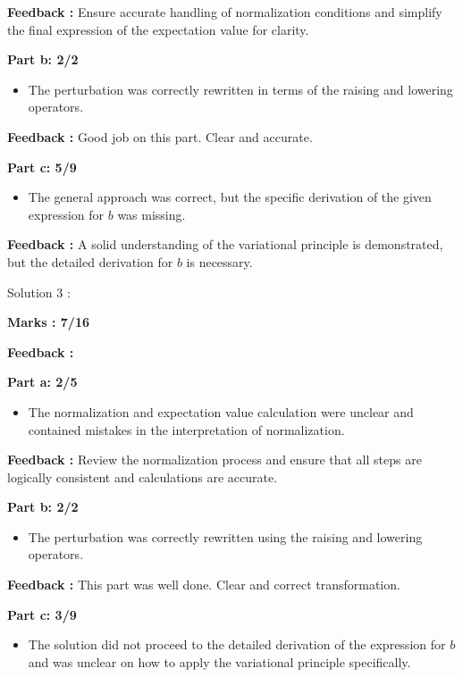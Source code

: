 \documentclass[a4paper,11pt]{article}
\begin{document}
\textbf{Feedback :}
Ensure accurate handling of normalization conditions and simplify the final expression of the expectation value for clarity.


\textbf{Part b: 2/2}
\begin{itemize}
    \item The perturbation was correctly rewritten in terms of the raising and lowering operators.
\end{itemize}

\textbf{Feedback :}
Good job on this part. Clear and accurate.


\textbf{Part c: 5/9}
\begin{itemize}
    \item The general approach was correct, but the specific derivation of the given expression for $b$ was missing.
\end{itemize}

\textbf{Feedback :}
A solid understanding of the variational principle is demonstrated, but the detailed derivation for $b$ is necessary.


Solution 3 :

\textbf{Marks : 7/16}

\textbf{Feedback :}

\textbf{Part a: 2/5}
\begin{itemize}
    \item The normalization and expectation value calculation were unclear and contained mistakes in the interpretation of normalization.
\end{itemize}

\textbf{Feedback :}
Review the normalization process and ensure that all steps are logically consistent and calculations are accurate.


\textbf{Part b: 2/2}
\begin{itemize}
    \item The perturbation was correctly rewritten using the raising and lowering operators.
\end{itemize}

\textbf{Feedback :}
This part was well done. Clear and correct transformation.


\textbf{Part c: 3/9}
\begin{itemize}
    \item The solution did not proceed to the detailed derivation of the expression for $b$ and was unclear on how to apply the variational principle specifically.
\end{itemize}
\end{document}
